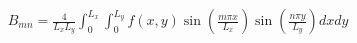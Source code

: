 \documentclass[preview]{standalone}
\begin{document}
\begin{align*}
B_{mn} = \frac{4}{L_xL_y}\int_0^{L_x}\int_0^{L_y}f(x,y)\sin(\frac{m\pi x}{L_x})\sin(\frac{n\pi y}{L_y})dxdy
\end{align*}
\end{document}
